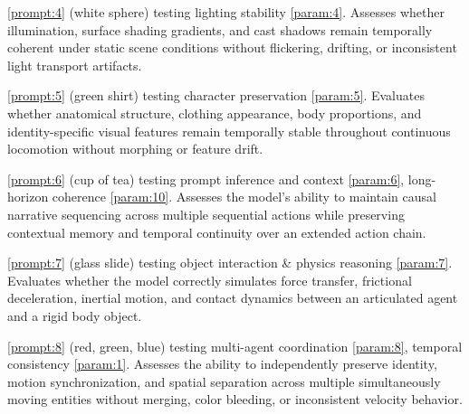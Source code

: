 \documentclass[sigconf]{acmart}
\begin{document}

\ref{prompt:4} (white sphere) testing lighting stability \ref{param:4}. Assesses whether illumination, surface shading gradients, and cast shadows remain temporally coherent under static scene conditions without flickering, drifting, or inconsistent light transport artifacts.


\ref{prompt:5} (green shirt) testing character preservation \ref{param:5}. Evaluates whether anatomical structure, clothing appearance, body proportions, and identity-specific visual features remain temporally stable throughout continuous locomotion without morphing or feature drift.


\ref{prompt:6} (cup of tea) testing prompt inference and context \ref{param:6}, long-horizon coherence \ref{param:10}. Assesses the model's ability to maintain causal narrative sequencing across multiple sequential actions while preserving contextual memory and temporal continuity over an extended action chain.



\ref{prompt:7} (glass slide) testing object interaction \& physics reasoning \ref{param:7}. Evaluates whether the model correctly simulates force transfer, frictional deceleration, inertial motion, and contact dynamics between an articulated agent and a rigid body object.


\ref{prompt:8} (red, green, blue) testing multi-agent coordination \ref{param:8}, temporal consistency \ref{param:1}. Assesses the ability to independently preserve identity, motion synchronization, and spatial separation across multiple simultaneously moving entities without merging, color bleeding, or inconsistent velocity behavior.
\end{document}

